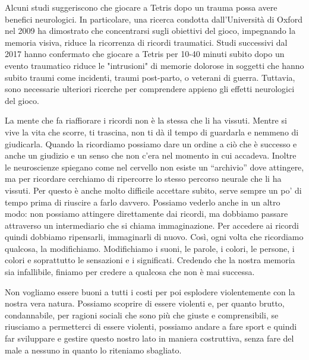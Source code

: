 \documentclass[12pt]{book} %
\begin{document}
\begin{mdframed}[linewidth=1pt]
Alcuni studi suggeriscono che giocare a Tetris dopo un trauma possa avere benefici neurologici. In particolare, una ricerca condotta dall'Università di Oxford nel 2009 ha dimostrato che concentrarsi sugli obiettivi del gioco, impegnando la memoria visiva, riduce la ricorrenza di ricordi traumatici. Studi successivi dal 2017 hanno confermato che giocare a Tetris per 10-40 minuti subito dopo un evento traumatico riduce le "intrusioni" di memorie dolorose in soggetti che hanno subito traumi come incidenti, traumi post-parto, o veterani di guerra. Tuttavia, sono necessarie ulteriori ricerche per comprendere appieno gli effetti neurologici del gioco.
\end{mdframed}

La mente che fa riaffiorare i ricordi non è la stessa che li ha vissuti. 
Mentre si vive la vita che scorre, ti trascina, non ti dà il tempo di guardarla e nemmeno di
giudicarla. Quando la ricordiamo possiamo dare un ordine a ciò che è successo e anche un giudizio e un senso che non
c'era nel momento in cui accadeva. Inoltre le neuroscienze spiegano come nel cervello non esiste
un “archivio” dove attingere, ma per ricordare cerchiamo di ripercorre lo stesso percorso neurale che li ha vissuti.
Per questo è anche molto difficile accettare subito, serve sempre un po' di tempo prima di
riuscire a farlo davvero. Possiamo vederlo anche in un altro modo: non possiamo attingere direttamente dai ricordi, ma
dobbiamo passare attraverso un intermediario che si chiama immaginazione. Per accedere ai ricordi quindi dobbiamo
ripensarli, immaginarli di nuovo. Così, ogni volta che ricordiamo qualcosa, la modifichiamo. Modifichiamo i suoni, le
parole, i colori, le persone, i colori e soprattutto le sensazioni e i significati. Credendo che la nostra memoria sia
infallibile, finiamo per credere a qualcosa che non è mai successa. 

Non vogliamo essere buoni a tutti i costi per poi esplodere violentemente con la nostra vera natura.
Possiamo scoprire di essere violenti e, per quanto brutto, condannabile, per ragioni sociali che sono più che giuste e
comprensibili, se riusciamo a permetterci di essere violenti, possiamo andare a fare sport e quindi far sviluppare e
gestire questo nostro lato in maniera costruttiva, senza fare del male a nessuno in quanto lo riteniamo sbagliato. 
\end{document}
